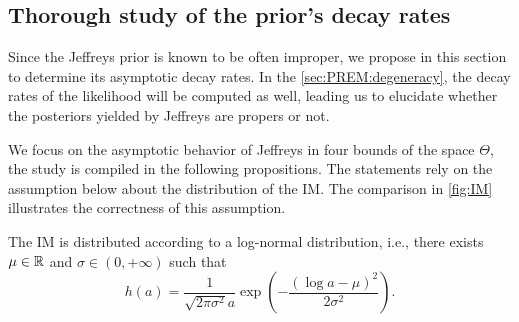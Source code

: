     



    \subsection{Thorough study of the prior's decay rates}\label{sec:PREM:subsec:jeffasymp}


    Since the Jeffreys prior is known to be often improper, we propose in this section to determine its asymptotic decay rates. In the \cref{sec:PREM:degeneracy}, the decay rates of the likelihood will be computed as well, leading us to elucidate whether the posteriors yielded by Jeffreys are propers or not.

    We focus on the asymptotic behavior of Jeffreys in four bounds of the space $\Theta$, the study is compiled in the following propositions. 
    The statements rely on the assumption below about the distribution of the IM. %
    The comparison in \cref{fig:IM} illustrates the correctness of this assumption.


    \begin{assu}
        The IM is distributed according to a log-normal distribution, i.e., there exists $\mu\in \mathbb{R}$ and $\sigma\in (0,+\infty)$ such that 
    \begin{equation}
        h(a) = \frac{1}{\sqrt{2\pi\sigma^2}a}\exp\left({-\frac{(\log a-\mu)^2}{2\sigma^2}}\right).
    \end{equation}
    \end{assu}

